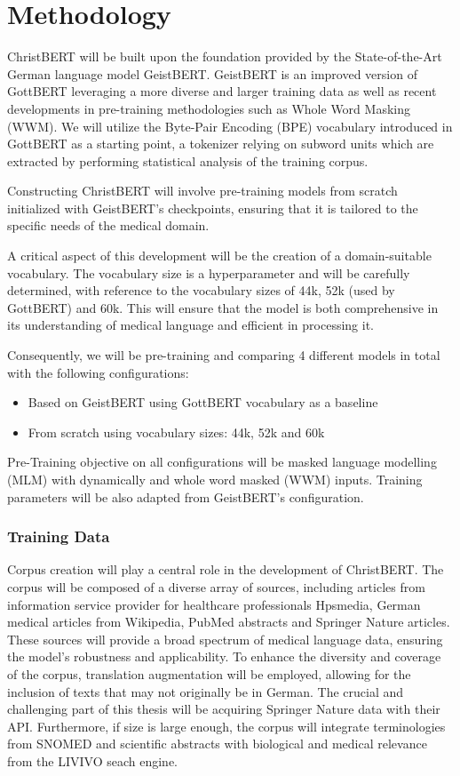 \chapter*{Methodology}\label{chapter:methodology}

ChristBERT will be built upon the foundation provided by the State-of-the-Art
German language model GeistBERT. GeistBERT is an improved version of GottBERT
leveraging a more diverse and larger training data as well as recent
developments in pre-training methodologies such as Whole Word Masking (WWM). We
will utilize the Byte-Pair Encoding (BPE) vocabulary introduced in
GottBERT as a starting point, a tokenizer relying on subword units which are
extracted by performing statistical analysis of the training corpus.

Constructing ChristBERT will involve pre-training models from scratch
initialized with GeistBERT's checkpoints, ensuring that it is tailored to the
specific needs of the medical domain.

A critical aspect of this development will be the creation of a domain-suitable
vocabulary. The vocabulary size is a hyperparameter and  will be carefully
determined, with reference to the vocabulary sizes of 44k, 52k (used by
GottBERT) and 60k. This will ensure that the model is both comprehensive in its
understanding of medical language and efficient in processing it.

Consequently, we will be pre-training and comparing 4 different models in total
with the following configurations:

\begin{itemize}
    \item Based on GeistBERT using GottBERT vocabulary as a baseline
    \item From scratch using vocabulary sizes: 44k, 52k and 60k
\end{itemize}

Pre-Training objective on all configurations will be masked language modelling
(MLM) with dynamically and whole word masked (WWM) inputs. Training parameters
will be also adapted from GeistBERT's configuration.

\subsection*{Training Data}

Corpus creation will play a central role in the development of ChristBERT. The
corpus will be composed of a diverse array of sources, including articles from
information service provider for healthcare professionals Hpsmedia, German
medical articles from Wikipedia, PubMed abstracts and Springer Nature articles.
These sources will provide a broad spectrum of medical language data, ensuring
the model's robustness and applicability. To enhance the diversity and coverage
of the corpus, translation augmentation will be employed, allowing for the
inclusion of texts that may not originally be in German. The crucial and
challenging part of this thesis will be acquiring Springer Nature data with
their API. Furthermore, if size is large enough, the corpus will integrate
terminologies from SNOMED and scientific abstracts with biological and medical
relevance from the LIVIVO seach engine.

